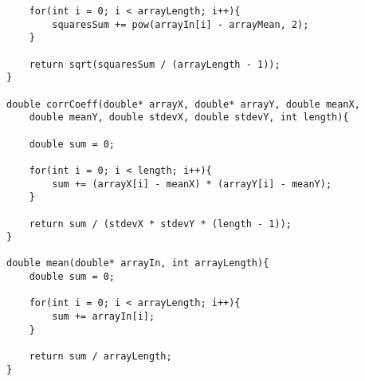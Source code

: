 \begin{lstlisting}
	for(int i = 0; i < arrayLength; i++){
		squaresSum += pow(arrayIn[i] - arrayMean, 2);
	}

	return sqrt(squaresSum / (arrayLength - 1));
}

double corrCoeff(double* arrayX, double* arrayY, double meanX, 
	double meanY, double stdevX, double stdevY, int length){

	double sum = 0;

	for(int i = 0; i < length; i++){
		sum += (arrayX[i] - meanX) * (arrayY[i] - meanY);
	}

	return sum / (stdevX * stdevY * (length - 1));
}

double mean(double* arrayIn, int arrayLength){
	double sum = 0;

	for(int i = 0; i < arrayLength; i++){
		sum += arrayIn[i];
	}

	return sum / arrayLength;
}

\end{lstlisting}